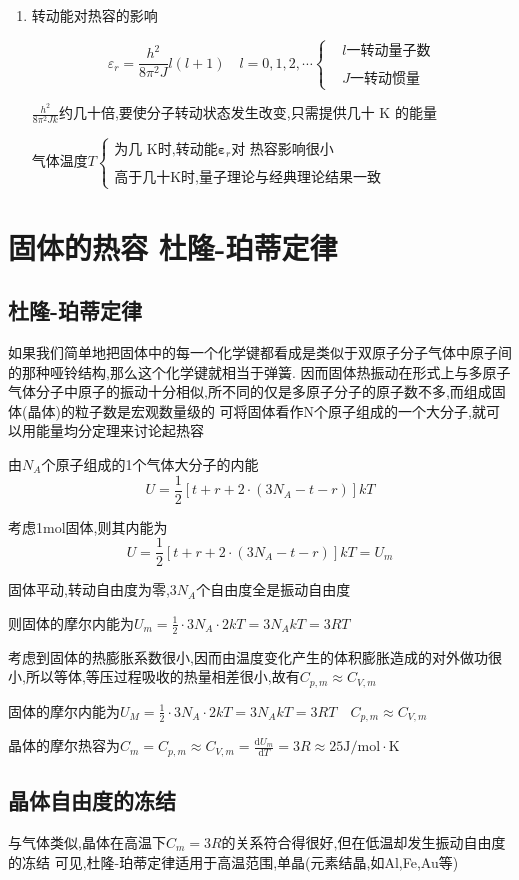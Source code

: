 \documentclass{article}
\begin{document}
\begin{enumerate}
    \vspace{3em}

    \item 转动能对热容的影响
    
    $$\varepsilon_r=\frac{h^2}{8\pi^2J}l(l+1)\quad l=0,1,2,\cdots\begin{cases}&l\text{一转动量子数}\\\\&J\text{一转动惯量}\end{cases}$$

    $\frac{h^2}{8\pi^2Jk}$约几十倍,要使分子转动状态发生改变,只需提供几十 K 的能量

    气体温度$T\left\{\begin{array}{cc}\text{为几 K时,转动能}\boldsymbol{\varepsilon}_r\text{对 热容影响很小}\\\\\text{高于几十K时,量子理论与经典理论结果一致}\end{array}\right.$


\end{enumerate}

\newpage

\section{固体的热容  杜隆-珀蒂定律}

\subsection{杜隆-珀蒂定律}


如果我们简单地把固体中的每一个化学键都看成是类似于双原子分子气体中原子间的那种哑铃结构,那么这个化学键就相当于弹簧.
因而固体热振动在形式上与多原子气体分子中原子的振动十分相似,所不同的仅是多原子分子的原子数不多,而组成固体(晶体)的粒子数是宏观数量级的
可将固体看作N个原子组成的一个大分子,就可以用能量均分定理来讨论起热容
    
由$N_{A}$个原子组成的1个气体大分子的内能
$$U=\frac12[t+r+2\cdot(3N_A-t-r)]kT$$

考虑1mol固体,则其内能为
$$U= \frac 12[ t+ r+ 2\cdot ( 3N_A- t- r) ] kT= U_m$$

固体平动,转动自由度为零,3$N_A$个自由度全是振动自由度

则固体的摩尔内能为$U_m=\frac{1}{2}\cdot3N_A\cdot2kT=3N_AkT=3RT$

考虑到固体的热膨胀系数很小,因而由温度变化产生的体积膨胀造成的对外做功很小,所以等体,等压过程吸收的热量相差很小,故有$C_{p,m}\approx C_{V,m}$
    
固体的摩尔内能为$U_M=\frac{1}{2}\cdot3N_A\cdot2kT=3N_AkT=3RT\quad C_{p,m}\approx C_{V,m}$

晶体的摩尔热容为$C_m=C_{p,m}\approx C_{V,m}=\frac{\mathrm{d}U_m}{\mathrm{d}T}=3R\approx25\mathrm{J}/\mathrm{mol}\cdot\mathrm{K}$



\subsection{晶体自由度的冻结}

与气体类似,晶体在高温下$C_m=3R$的关系符合得很好,但在低温却发生振动自由度的冻结
可见,杜隆-珀蒂定律适用于高温范围,单晶(元素结晶,如Al,Fe,Au等)
\end{document}
